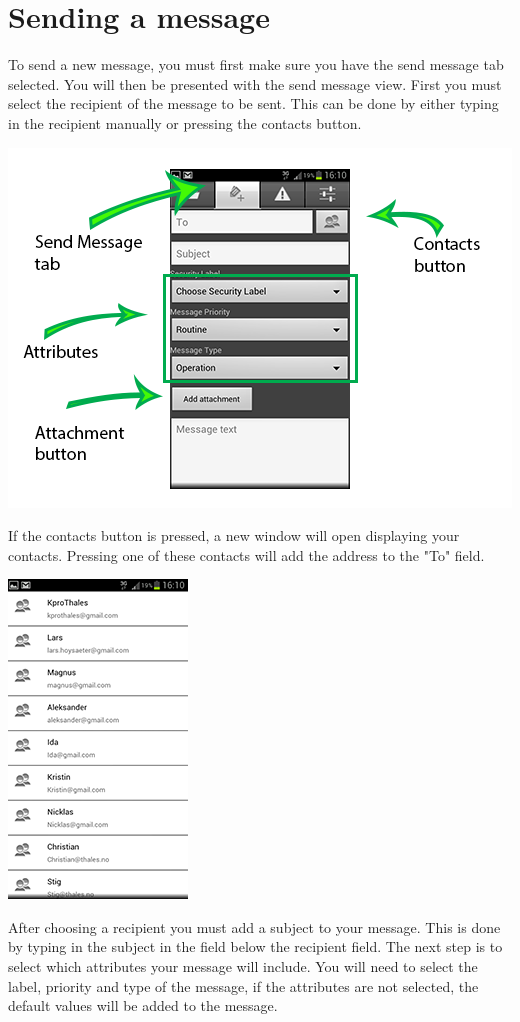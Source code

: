 \section*{Sending a message}
To send a new message, you must first make sure you have the send message tab selected. You will then be presented with the send message view. \newline \newline First you must select the recipient of the message to be sent. This can be done by either typing in the recipient manually or pressing the contacts button.  
  \begin{center}
    \includegraphics{sendmessagearrows}
  \end{center}
  \newpage
  If the contacts button is pressed, a new window will open displaying your contacts. Pressing one of these contacts will add the address to the "To" field.
  \begin{center}
    \includegraphics{Contacts1}
  \end{center}
\newpage
After choosing a recipient you must add a subject to your message. This is done by typing in the subject in the field below the recipient field.
\newline 
\newline 
The next step is to select which attributes your message will include. You will need to select the label, priority and type of the message, if the attributes are not selected, the default values will be added to the message. 

